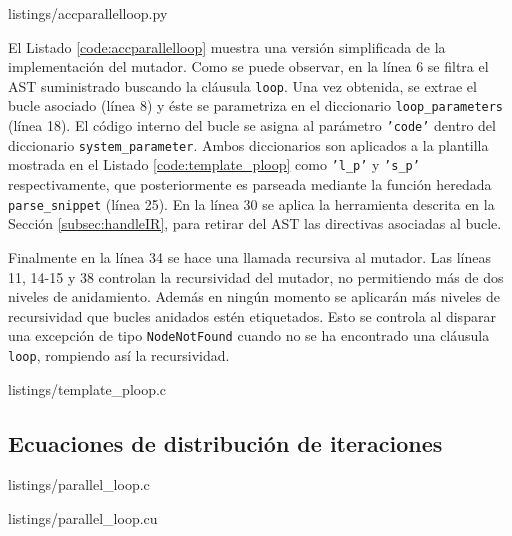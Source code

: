 
{listings/accparallelloop.py} %

El Listado \ref{code:accparallelloop} muestra una versión simplificada de la 
implementación del mutador. Como se puede observar, en la línea 6 se filtra el \ac{AST}
suministrado buscando la cláusula \texttt{loop}. Una vez obtenida, se extrae el bucle
asociado (línea 8) y éste se parametriza en el diccionario \texttt{loop\_parameters} 
(línea 18). El código interno del bucle se asigna al parámetro \texttt{'code'} dentro del 
diccionario \texttt{system\_parameter}. Ambos diccionarios son aplicados a la plantilla
mostrada en el Listado \ref{code:template_ploop} como \texttt{'l\_p'} y \texttt{'s\_p'} respectivamente, que 
posteriormente es parseada mediante la función heredada \texttt{parse\_snippet} (línea 
25). En la línea 30 se aplica la herramienta  descrita en la Sección
\ref{subsec:handleIR}, para retirar del \ac{AST} las directivas asociadas al bucle.

Finalmente en la línea 34 se hace una llamada recursiva al mutador. Las líneas 11, 14-15 y 
38 controlan la recursividad del mutador, no permitiendo más de dos niveles de 
anidamiento. Además en ningún momento se aplicarán más niveles de recursividad que bucles
anidados estén etiquetados. Esto se controla al disparar una excepción de tipo 
\texttt{NodeNotFound} cuando no se ha encontrado una cláusula \texttt{loop}, rompiendo así
la recursividad.


{listings/template_ploop.c} %

\subsection{Ecuaciones de distribución de iteraciones}
\label{subsec:ecuations}


{listings/parallel_loop.c} %


{listings/parallel_loop.cu} %



